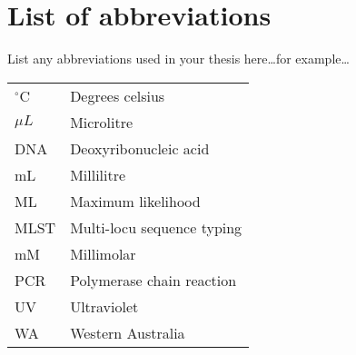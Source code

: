 \documentclass[12pt,oneside]{CSUNthesis}
\begin{document}
\chapter*{List of abbreviations}\label{list-of-abbreviations}

List any abbreviations used in your thesis here\ldots for example\ldots{}

\begin{longtable}[]{@{}ll@{}}
\toprule\noalign{}
\endhead
\bottomrule\noalign{}
\endlastfoot
\(^\circ\)C & Degrees celsius \\
\(\mu L\) & Microlitre \\
DNA & Deoxyribonucleic acid \\
mL & Millilitre \\
ML & Maximum likelihood \\
MLST & Multi-locu sequence typing \\
mM & Millimolar \\
PCR & Polymerase chain reaction \\
UV & Ultraviolet \\
WA & Western Australia \\
\end{longtable}

\backmatter
\end{document}
